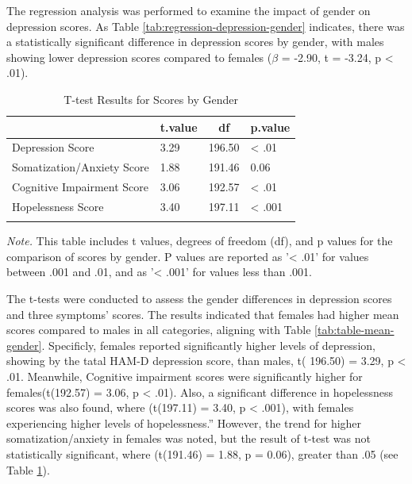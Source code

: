 \documentclass[
  man,floatsintext]{apa6}
\begin{document}
The regression analysis was performed to examine the impact of gender on depression scores. As Table \ref{tab:regression-depression-gender} indicates, there was a statistically significant difference in depression scores by gender, with males showing lower depression scores compared to females (\(\beta\) = -2.90, t = -3.24, p \textless{} .01).

\begin{table}[tbp]

\begin{center}
\begin{threeparttable}

\caption{\label{tab:ttest-scores-gender}T-test Results for Scores by Gender}

\begin{tabular}{llll}
\toprule
 & \multicolumn{1}{c}{t.value} & \multicolumn{1}{c}{df} & \multicolumn{1}{c}{p.value}\\
\midrule
Depression Score & 3.29 & 196.50 & < .01\\
Somatization/Anxiety Score & 1.88 & 191.46 & 0.06\\
Cognitive Impairment Score & 3.06 & 192.57 & < .01\\
Hopelessness Score & 3.40 & 197.11 & < .001\\
\bottomrule
\addlinespace
\end{tabular}

\begin{tablenotes}[para]
\normalsize{\textit{Note.} This table includes t values, degrees of freedom (df), and p values for the comparison of scores by gender. P values are reported as '< .01' for values between .001 and .01, and as '< .001' for values less than .001.}
\end{tablenotes}

\end{threeparttable}
\end{center}

\end{table}

The t-tests were conducted to assess the gender differences in depression scores and three symptoms' scores. The results indicated that females had higher mean scores compared to males in all categories, aligning with Table \ref{tab:table-mean-gender}. Specificly, females reported significantly higher levels of depression, showing by the tatal HAM-D depression score, than males, t( 196.50) = 3.29, p \textless{} .01.
Meanwhile, Cognitive impairment scores were significantly higher for females(t(192.57) = 3.06, p \textless{} .01). Also, a significant difference in hopelessness scores was also found, where (t(197.11) = 3.40, p \textless{} .001), with females experiencing higher levels of hopelessness.''
However, the trend for higher somatization/anxiety in females was noted, but the result of t-test was not statistically significant, where (t(191.46) = 1.88, p = 0.06), greater than .05 (see Table \ref{tab:ttest-scores-gender}).
\end{document}
